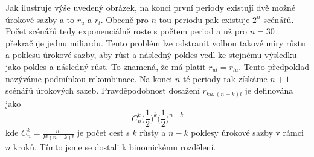 \documentclass[a4paper]{book}
\begin{document}
Jak ilustruje výše uvedený obrázek, na konci první periody existují dvě možné úrokové sazby a to $r_u$ a $r_l$. Obecně pro $n$-tou periodu pak existuje $2^n$ scénářů. Počet scénářů tedy exponenciálně roste s počtem period a už pro $n=30$ překračuje jednu miliardu. Tento problém lze odstranit volbou takové míry růstu a poklesu úrokové sazby, aby růst a následný pokles vedl ke stejnému výsledku jako pokles a následný růst. To znamená, že má platit $r_{ul} = r_{lu}$. Tento předpoklad nazýváme podmínkou rekombinace. Na konci $n$-té periody tak získáme $n+1$ scénářů úrokových sazeb. Pravděpodobnost dosažení $r_{ku, (n-k)l}$ je definována jako
\begin{equation*}
C_n^k \Bigg( \frac{1}{2} \Bigg)^k \Bigg( \frac{1}{2} \Bigg)^{n-k}
\end{equation*}
kde $C_n^k = \frac{n!}{k!(n-k)!}$ je počet cest s $k$ růsty a $n-k$ poklesy úrokové sazby v rámci $n$ kroků. Tímto jsme se dostali k binomickému rozdělení.
\end{document}
